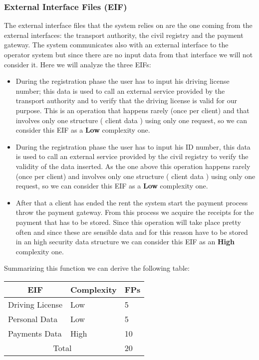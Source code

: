 \subsubsection{External Interface Files (EIF)}
The external interface files  that the system relies on are the one coming from the external interfaces: the  transport authority, the civil registry and the payment gateway. The system communicates also with an external interface to the operator system but since there are no input data from that interface we will not consider it. Here we will analyze the three EIFs:
\begin{itemize}
\item During the registration phase the user has to input his driving license number; this data is used to call an external service provided by the transport authority and to verify that the driving license is valid for our purpose. This is an operation that happens rarely (once per client) and that involves only one structure ( client data ) using only one request, so we can consider this EIF as a \textbf{Low} complexity one. \\
\item  During the registration phase the user has to input his ID number, this data is used to call an external service provided by the civil registry  to verify the validity of the data inserted. As the one above this operation happens rarely (once per client) and involves only one structure ( client data ) using only one request, so we can consider this EIF as a \textbf{Low} complexity one. \\ 
\item After that a client has ended the rent the system start the payment process throw the payment gateway. From this process we acquire the receipts for the payment that has to be stored. Since this operation will take place pretty often and since these are sensible data and for this reason have to be stored in an high security data structure we can consider this EIF as an \textbf{High} complexity one.
\end{itemize}
Summarizing this function we can derive the following table:
\begin{center}
\begin{tabular}{|l l l|}
\hline
\multicolumn{1}{|c}{EIF}&Complexity&FPs\\
\hline
Driving License & Low& 5 \\
Personal Data & Low & 5\\
Payments Data& High&10\\\hline
\multicolumn{2}{|c}{Total}&20\\
\hline
\end{tabular}
\end{center}
